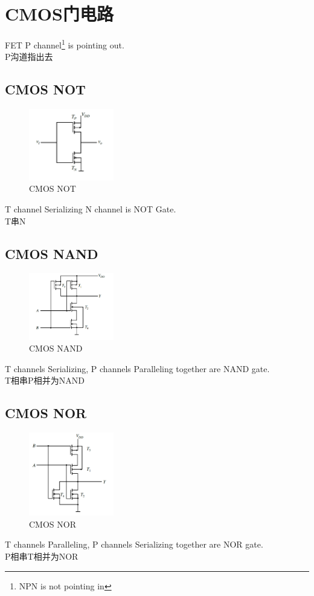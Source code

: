 \documentclass[scheme=chinese,a4paper]{report}
\begin{document}
\chapter{CMOS门电路}
FET P channel\footnote{NPN is not pointing in} is pointing out. \\
P沟道指出去
\section{CMOS NOT}
\begin{figure}[H]
    \centering
    \includegraphics[width=0.33\textwidth]{cmos_not.png}
    \caption{CMOS NOT}
\end{figure}
T channel Serializing N channel is NOT Gate.\\T串N
\section{CMOS NAND}
\begin{figure}[H]
\centering
\includegraphics[width=0.33\textwidth]{cmos_nand.png}
\caption{CMOS NAND}
\end{figure}
T channels Serializing, P channels Paralleling together are NAND gate. \\
T相串P相并为NAND
\section{CMOS NOR}
\begin{figure}[H]
    \centering
    \includegraphics[width=0.33\textwidth]{cmos_nor.png}
    \caption{CMOS NOR}
    \end{figure}
T channels Paralleling, P channels Serializing together are NOR gate. \\
P相串T相并为NOR
\end{document}

